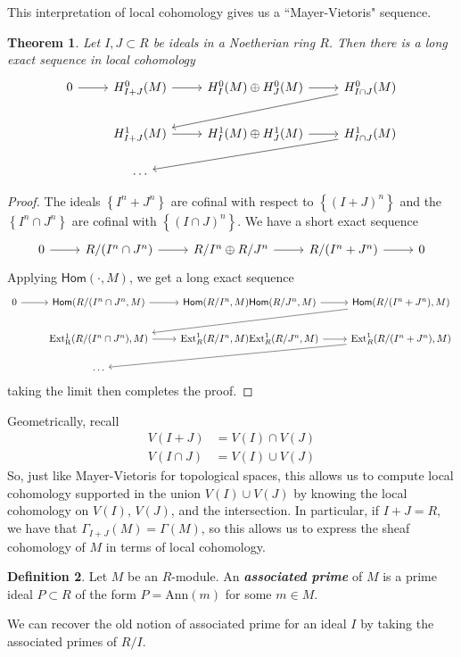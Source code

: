 \documentclass[psamsfonts, 12pt]{amsart}
\newtheorem{thm}{Theorem}[section]
\theoremstyle{definition}
\newtheorem{defn}[thm]{Definition}
\theoremstyle{remark}
\renewcommand{\hom}{\mathsf{Hom}}
\newcommand{\ib}[1]{\textbf{\textit{#1}}}
\newcommand{\set}[1]{\left\lbrace #1 \right\rbrace}
\begin{document}
This interpretation of local cohomology gives us a ``Mayer-Vietoris" sequence.
%
\begin{thm}
Let $I,J \subset R$ be ideals in a Noetherian ring $R$. Then there is a long
exact sequence in local cohomology
\[\begin{tikzcd}
0 \ar[r] & H^0_{I+J}(M) \ar[r] & H^0_I(M) \oplus H^0_J(M) \ar[r] &
H^0_{I \cap J}(M) \ar[dll]\\
& H^1_{I+J}(M)\ar[r] & H^1_I(M) \oplus H^1_J(M) \ar[r] & H^1_{I \cap J}(M) \ar[dll]\\
& \ldots
\end{tikzcd}\]
\end{thm}
%
\begin{proof}
The ideals $\set{I^n + J^n}$ are cofinal with respect to $\set{(I+J)^n}$ and
the $\set{I^n \cap J^n}$ are cofinal with $\set{(I\cap J )^n}$. We have a short exact
sequence
\[\begin{tikzcd}
0 \ar[r] & R/(I^n \cap J^n) \ar[r] & R/I^n \oplus R/J^n \ar[r] & R/(I^n+J^n) \ar[r] & 0
\end{tikzcd}\]
Applying $\hom(\cdot, M)$, we get a long exact sequence
\[\begin{tikzcd}
0 \ar[r] & \hom(R/(I^n \cap J^n, M) \ar[r] & \hom(R/I^n, M) \hom(R/J^n, M) \ar[r] &
\hom(R/(I^n+J^n),M) \ar[dll] \\
& \mathrm{Ext^1_R}(R/(I^n \cap J^n), M) \ar[r] & \mathrm{Ext}_R^1(R/I^n, M)
\mathrm{Ext}^1_R(R/J^n, M) \ar[r] & \mathrm{Ext}_R^1(R/(I^n+J^n),M) \ar[dll] \\
& \ldots
\end{tikzcd}\]
taking the limit then completes the proof.
\end{proof}
%
Geometrically, recall
\begin{align*}
V(I + J) &= V(I) \cap V(J) \\
V(I \cap J) &= V(I) \cup V(J)
\end{align*}
So, just like Mayer-Vietoris for topological spaces, this allows us to compute
local cohomology supported in the union $V(I) \cup V(J)$ by knowing
the local cohomology on $V(I)$, $V(J)$, and the intersection. In particular,
if $I+J = R$, we have that $\Gamma_{I+J}(M) = \Gamma(M)$, so this allows us to express
the sheaf cohomology of $M$ in terms of local cohomology.
%
\begin{defn}
Let $M$ be an $R$-module. An \ib{associated prime} of $M$ is a prime ideal $P \subset R$
of the form $P = \mathrm{Ann}(m)$ for some $m \in M$.
\end{defn}
%
We can recover the old notion of associated prime for an ideal $I$ by taking the
associated primes of $R/I$.
%
\end{document}
